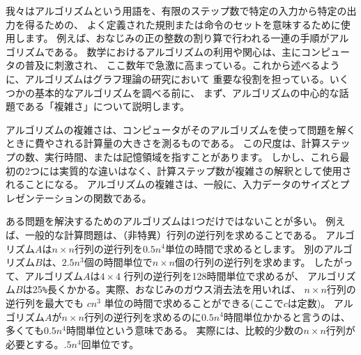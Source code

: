 
我々はアルゴリズムという用語を、有限のステップ数で特定の入力から特定の出力を得るための、
よく定義された規則または命令のセットを意味するために使用します。
例えば、おなじみの正の整数の割り算で行われる一連の手順がアルゴリズムである。
数学におけるアルゴリズムの利用や関心は、主にコンピュータの普及に刺激され、
ここ数年で急激に高まっている。これから述べるように、アルゴリズムはグラフ理論の研究において
重要な役割を担っている。いくつかの基本的なアルゴリズムを調べる前に、
まず、アルゴリズムの中心的な話題である「複雑さ」について説明します。

アルゴリズムの複雑さは、コンピュータがそのアルゴリズムを使って問題を解くときに費やされる計算量の大きさを測るものである。
この尺度は、計算ステップの数、実行時間、または記憶領域を指すことがあります。
しかし、これら最初の2つには実質的な違いはなく、計算ステップ数が複雑さの解釈として使用されることになる。
アルゴリズムの複雑さは、一般に、入力データのサイズとプレゼンテーションの関数である。

ある問題を解決するためのアルゴリズムは1つだけではないことが多い。
例えば、一般的な計算問題は、（非特異）行列の逆行列を求めることである。
アルゴリズム$A$は$n \times n$行列の逆行列を$0.5n^4$単位の時間で求めるとします。
別のアルゴリズム$B$は、$2.5n^3$個の時間単位で$n \times n$個の行列の逆行列を求めます。
したがって、アルゴリズム$A$は$4 \times 4$ 行列の逆行列を128時間単位で求めるが、
アルゴリズム$B$は25\verb|%|長くかかる。実際、おなじみのガウス消去法を用いれば、
$n \times n$行列の逆行列を最大でも $cn^3$ 単位の時間で求めることができる(ここで$c$は定数)。
アルゴリズム$A$が$n\times n$行列の逆行列を求めるのに$0.5n^4$時間単位かかると言うのは、多くても$0.5n^4$時間単位という意味である。
実際には、比較的少数の$n\times n$行列が必要とする。$.5n^4$回単位です。